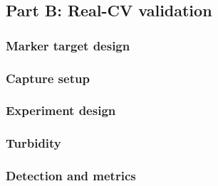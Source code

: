 \subsection{Part B: Real-CV validation}

\subsubsection{Marker target design}

\subsubsection{Capture setup}

\subsubsection{Experiment design}

\subsubsection{Turbidity}

\subsubsection{Detection and metrics}
